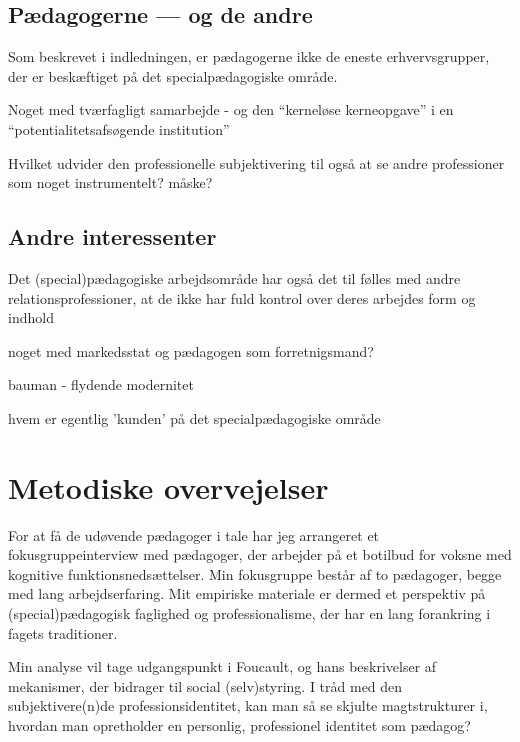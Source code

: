 \subsection{Pædagogerne — og de andre}

Som beskrevet i indledningen, er pædagogerne ikke de eneste erhvervsgrupper, der er beskæftiget på det specialpædagogiske område.


Noget med tværfagligt samarbejde - og den “kerneløse kerneopgave” i en “potentialitetsafsøgende institution” \autocite{mik-meyerIndledningSkabeProfessionel2012}

Hvilket udvider den professionelle subjektivering til også at se andre professioner som noget instrumentelt? måske?

\subsection{Andre interessenter}
Det (special)pædagogiske arbejdsområde har også det til følles med andre  relationsprofessioner, at de ikke har fuld kontrol over deres arbejdes form og indhold

noget med markedsstat og pædagogen som forretnigsmand?


bauman - flydende modernitet

hvem er egentlig 'kunden' på det specialpædagogiske område

\section{Metodiske overvejelser}

For at få de udøvende pædagoger i tale har jeg arrangeret et fokusgruppeinterview med pædagoger, der arbejder på et botilbud for voksne med kognitive funktionsnedsættelser.
Min fokusgruppe består af to pædagoger, begge med lang arbejdserfaring.
Mit empiriske materiale er dermed et perspektiv på (special)pædagogisk faglighed og professionalisme, der har en lang forankring i fagets traditioner.

Min analyse vil tage udgangspunkt i Foucault, og hans beskrivelser af mekanismer, der bidrager til social (selv)styring. I tråd med den subjektivere(n)de professionsidentitet, kan man så se skjulte magtstrukturer i, hvordan man opretholder en personlig, professionel identitet som pædagog?

